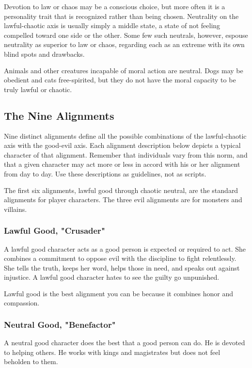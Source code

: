 Devotion to law or chaos may be a conscious choice, but more often it is a personality 
trait that is recognized rather than being chosen. Neutrality on the lawful-chaotic 
axis is usually simply a middle state, a state of not feeling compelled toward 
one side or the other. Some few such neutrals, however, espouse neutrality as superior 
to law or chaos, regarding each as an extreme with its own blind spots and drawbacks.

Animals and other creatures incapable of moral action are neutral. Dogs may be 
obedient and cats free-spirited, but they do not have the moral capacity to be 
truly lawful or chaotic.

\subsection{The Nine Alignments}

Nine distinct alignments define all the possible combinations of the lawful-chaotic 
axis with the good-evil axis. Each alignment description below depicts a typical 
character of that alignment. Remember that individuals vary from this norm, and 
that a given character may act more or less in accord with his or her alignment 
from day to day. Use these descriptions as guidelines, not as scripts.

The first six alignments, lawful good through chaotic neutral, are the standard 
alignments for player characters. The three evil alignments are for monsters and 
villains.

\subsubsection{Lawful Good, "Crusader"}
A lawful good character acts as a good person 
is expected or required to act. She combines a commitment to oppose evil with the 
discipline to fight relentlessly. She tells the truth, keeps her word, helps those 
in need, and speaks out against injustice. A lawful good character hates to see 
the guilty go unpunished.

Lawful good is the best alignment you can be because it combines honor and compassion.

\subsubsection{Neutral Good, "Benefactor"}
A neutral good character does the best that 
a good person can do. He is devoted to helping others. He works with kings and 
magistrates but does not feel beholden to them.


